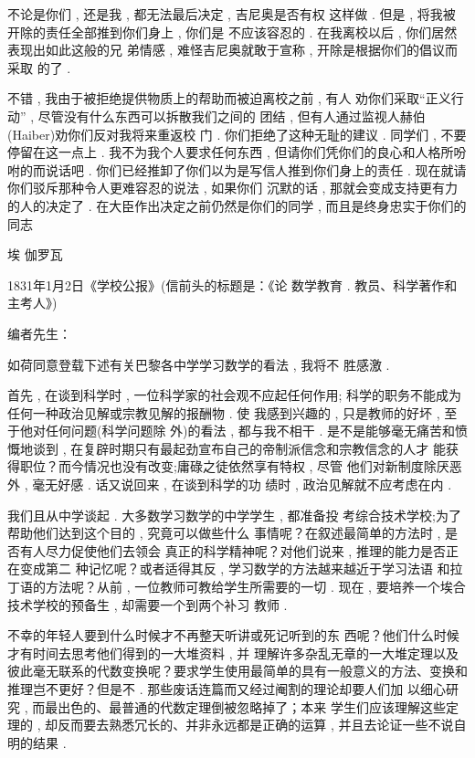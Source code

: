 不论是你们 , 还是我 , 都无法最后决定 , 吉尼奥是否有权 这样做 . 但是 , 将我被开除的责任全部推到你们身上 , 你们是 不应该容忍的 . 在我离校以后 , 你们居然表现出如此这般的兄 弟情感 , 难怪吉尼奥就敢于宣称 , 开除是根据你们的倡议而采取 的了 . 

不错 , 我由于被拒绝提供物质上的帮助而被迫离校之前 , 有人 劝你们采取“正义行动” , 尽管没有什么东西可以拆散我们之间的 团结 , 但有人通过监视人赫伯(Haiber)劝你们反对我将来重返校 门 . 你们拒绝了这种无耻的建议 . 同学们 , 不要停留在这一点上 .  我不为我个人要求任何东西 , 但请你们凭你们的良心和人格所吩 咐的而说话吧 . 你们已经推卸了你们以为是写信人推到你们身上的责任 . 现在就请你们驳斥那种令人更难容忍的说法 , 如果你们 沉默的话 , 那就会变成支持更有力的人的决定了 . 在大臣作出决定之前仍然是你们的同学 , 而且是终身忠实于你们的同志

\begin{flushright}
	埃 \textbullet 伽罗瓦
\end{flushright}

\begin{center}
	1831年1月2日《学校公报》(信前头的标题是：《论 数学教育 . 教员、科学著作和主考人》)
\end{center}

编者先生：

如荷同意登载下述有关巴黎各中学学习数学的看法 , 我将不 胜感激 . 

首先 , 在谈到科学时 , 一位科学家的社会观不应起任何作用; 科学的职务不能成为任何一种政治见解或宗教见解的报酬物 . 使 我感到兴趣的 , 只是教师的好坏 , 至于他对任何问题(科学问题除 外)的看法 , 都与我不相干 . 是不是能够毫无痛苦和愤慨地谈到 ,  在复辟时期只有最起劲宣布自己的帝制派信念和宗教信念的人才 能获得职位？而今情况也没有改变;庸碌之徒依然享有特权 , 尽管 他们对新制度除厌恶外 , 毫无好感 . 话又说回来 , 在谈到科学的功 绩时 , 政治见解就不应考虑在内 . 

我们且从中学谈起 . 大多数学习数学的中学学生 , 都准备投 考综合技术学校;为了帮助他们达到这个目的 , 究竟可以做些什么 事情呢？在叙述最简单的方法时 , 是否有人尽力促使他们去领会 真正的科学精神呢？对他们说来 , 推理的能力是否正在变成第二 种记忆呢？或者适得其反 , 学习数学的方法越来越近于学习法语 和拉丁语的方法呢？从前 , 一位教师可教给学生所需要的一切 .  现在 , 要培养一个埃合技术学校的预备生 , 却需要一个到两个补习 教师 . 

不幸的年轻人要到什么时候才不再整天听讲或死记听到的东 西呢？他们什么时候才有时间去思考他们得到的一大堆资料 , 并 理解许多杂乱无章的一大堆定理以及彼此毫无联系的代数变换呢？要求学生使用最简单的具有一般意义的方法、变换和推理岂不更好？但是不 . 那些废话连篇而又经过阉割的理论却要人们加 以细心研究 , 而最出色的、最普通的代数定理倒被忽略掉了；本来 学生们应该理解这些定理的 , 却反而要去熟悉冗长的、并非永远都是正确的运算 , 并且去论证一些不说自明的结果 . 

